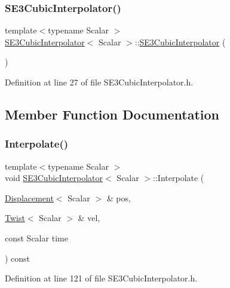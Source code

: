 \subsubsection{\texorpdfstring{S\+E3\+Cubic\+Interpolator()}{SE3CubicInterpolator()}}
{\footnotesize\ttfamily template$<$typename Scalar $>$ \\
\hyperlink{class_s_e3_cubic_interpolator}{S\+E3\+Cubic\+Interpolator}$<$ Scalar $>$\+::\hyperlink{class_s_e3_cubic_interpolator}{S\+E3\+Cubic\+Interpolator} (\begin{DoxyParamCaption}{ }\end{DoxyParamCaption})\hspace{0.3cm}{\ttfamily [inline]}}



Definition at line 27 of file S\+E3\+Cubic\+Interpolator.\+h.



\subsection{Member Function Documentation}
\hypertarget{class_s_e3_cubic_interpolator_aebb1a7f9c3123cd3df8cec6d9dc5a72a}{}\label{class_s_e3_cubic_interpolator_aebb1a7f9c3123cd3df8cec6d9dc5a72a} 
\subsubsection{\texorpdfstring{Interpolate()}{Interpolate()}}
{\footnotesize\ttfamily template$<$typename Scalar $>$ \\
void \hyperlink{class_s_e3_cubic_interpolator}{S\+E3\+Cubic\+Interpolator}$<$ Scalar $>$\+::Interpolate (\begin{DoxyParamCaption}\item[{\hyperlink{class_displacement}{Displacement}$<$ Scalar $>$ \&}]{pos,  }\item[{\hyperlink{class_twist}{Twist}$<$ Scalar $>$ \&}]{vel,  }\item[{const Scalar}]{time }\end{DoxyParamCaption}) const}



Definition at line 121 of file S\+E3\+Cubic\+Interpolator.\+h.

\hypertarget{class_s_e3_cubic_interpolator_aa070ccd623a41b2eb12b6513aab14021}{}\label{class_s_e3_cubic_interpolator_aa070ccd623a41b2eb12b6513aab14021} 

